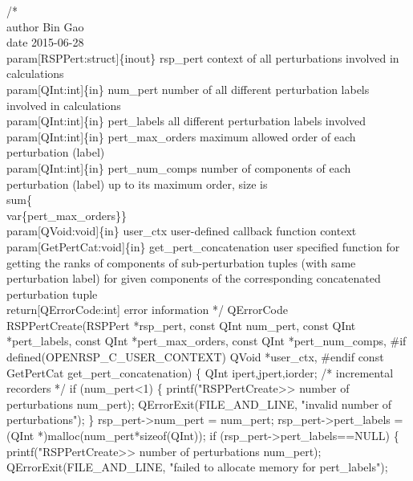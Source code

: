 /*%
    \\author Bin Gao
    \\date 2015-06-28
    \\param[RSPPert:struct]\{inout\} rsp_pert context of all perturbations involved in calculations
    \\param[QInt:int]\{in\} num_pert number of all different perturbation labels involved
        in calculations
    \\param[QInt:int]\{in\} pert_labels all different perturbation labels involved
    \\param[QInt:int]\{in\} pert_max_orders maximum allowed order of each perturbation (label)
    \\param[QInt:int]\{in\} pert_num_comps number of components of each perturbation (label)
        up to its maximum order, size is \\sum\{\\var\{pert_max_orders\}\}
    \\param[QVoid:void]\{in\} user_ctx user-defined callback function context
    \\param[GetPertCat:void]\{in\} get_pert_concatenation user specified function for
        getting the ranks of components of sub-perturbation tuples (with same
        perturbation label) for given components of the corresponding concatenated
        perturbation tuple
    \\return[QErrorCode:int] error information
*/
QErrorCode RSPPertCreate(RSPPert *rsp_pert,
                         const QInt num_pert,
                         const QInt *pert_labels,
                         const QInt *pert_max_orders,
                         const QInt *pert_num_comps,
#if defined(OPENRSP_C_USER_CONTEXT)
                         QVoid *user_ctx,
#endif
                         const GetPertCat get_pert_concatenation)
\{
    QInt ipert,jpert,iorder;  /* incremental recorders */
    if (num_pert<1) \{
        printf("RSPPertCreate>> number of perturbations %
               num_pert);
        QErrorExit(FILE_AND_LINE, "invalid number of perturbations");
    \}
    rsp_pert->num_pert = num_pert;
    rsp_pert->pert_labels = (QInt *)malloc(num_pert*sizeof(QInt));
    if (rsp_pert->pert_labels==NULL) \{
        printf("RSPPertCreate>> number of perturbations %
               num_pert);
        QErrorExit(FILE_AND_LINE, "failed to allocate memory for pert_labels");
